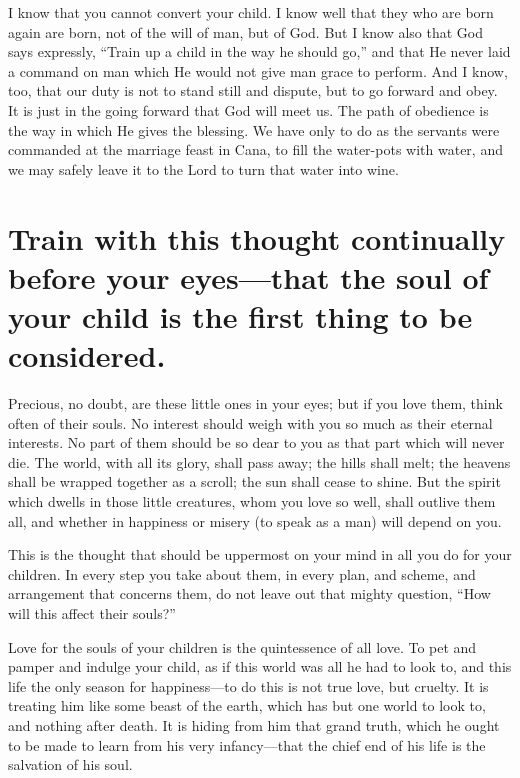 \documentclass[
]{book}
\begin{document}
I know that you cannot convert your child. I know well that they who are born again are born, not of the will of man, but of God. But I know also that God says expressly, ``Train up a child in the way he should go,'' and that He never laid a command on man which He would not give man grace to perform. And I know, too, that our duty is not to stand still and dispute, but to go forward and obey. It is just in the going forward that God will meet us. The path of obedience is the way in which He gives the blessing. We have only to do as the servants were commanded at the marriage feast in Cana, to fill the water-pots with water, and we may safely leave it to the Lord to turn that water into wine.

\hypertarget{train-with-this-thought-continually-before-your-eyesthat-the-soul-of-your-child-is-the-first-thing-to-be-considered.}{%
\chapter{Train with this thought continually before your eyes---that the soul of your child is the first thing to be considered.}\label{train-with-this-thought-continually-before-your-eyesthat-the-soul-of-your-child-is-the-first-thing-to-be-considered.}}

Precious, no doubt, are these little ones in your eyes; but if you love them, think often of their souls. No interest should weigh with you so much as their eternal interests. No part of them should be so dear to you as that part which will never die. The world, with all its glory, shall pass away; the hills shall melt; the heavens shall be wrapped together as a scroll; the sun shall cease to shine. But the spirit which dwells in those little creatures, whom you love so well, shall outlive them all, and whether in happiness or misery (to speak as a man) will depend on you.

This is the thought that should be uppermost on your mind in all you do for your children. In every step you take about them, in every plan, and scheme, and arrangement that concerns them, do not leave out that mighty question, ``How will this affect their souls?''

Love for the souls of your children is the quintessence of all love. To pet and pamper and indulge your child, as if this world was all he had to look to, and this life the only season for happiness---to do this is not true love, but cruelty. It is treating him like some beast of the earth, which has but one world to look to, and nothing after death. It is hiding from him that grand truth, which he ought to be made to learn from his very infancy---that the chief end of his life is the salvation of his soul.
\end{document}
